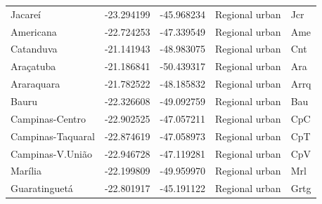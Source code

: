 \begin{table}
\begin{tabular}{lrrll}
                    Jacareí & -23.294199 & -45.968234 &       Regional urban &    Jcr \\
                  Americana & -22.724253 & -47.339549 &       Regional urban &    Ame \\
                  Catanduva & -21.141943 & -48.983075 &       Regional urban &    Cnt \\
                  Araçatuba & -21.186841 & -50.439317 &       Regional urban &    Ara \\
                 Araraquara & -21.782522 & -48.185832 &       Regional urban &   Arrq \\
                      Bauru & -22.326608 & -49.092759 &       Regional urban &    Bau \\
            Campinas-Centro & -22.902525 & -47.057211 &       Regional urban &    CpC \\
          Campinas-Taquaral & -22.874619 & -47.058973 &       Regional urban &    CpT \\
           Campinas-V.União & -22.946728 & -47.119281 &       Regional urban &    CpV \\
                    Marília & -22.199809 & -49.959970 &       Regional urban &    Mrl \\
              Guaratinguetá & -22.801917 & -45.191122 &       Regional urban &   Grtg \\
	\bottomrule
	\end{tabular}
\end{table}

